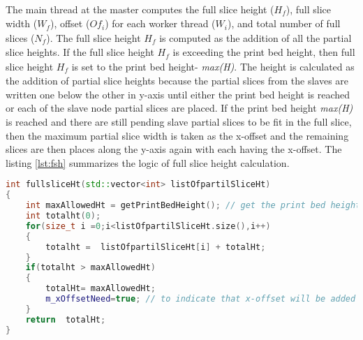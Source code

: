 The main thread at the master computes the full slice height (\begin{math}H_{\textit{f}}\end{math}), full slice width (\begin{math}W_{\textit{f}}\end{math}), offset (\begin{math}Of_{\textit{i}}\end{math}) for each worker thread (\begin{math}W_{\textit{i}}\end{math}), and total number of full slices (\begin{math}N_{\textit{f}}\end{math}). The full slice height \begin{math}H_{\textit{f}}\end{math} is computed as the addition of all the partial slice heights. If the full slice height \begin{math}H_{\textit{f}}\end{math} is exceeding the print bed height, then full slice height \begin{math}H_{\textit{f}}\end{math} is set to the print bed height- \textit{max(H)}. The height is calculated as the addition of partial slice heights because the partial slices from the slaves are written one below the other in y-axis until either the print bed height is reached or each of the slave node partial slices are placed. If the print bed height \textit{max(H)} is reached and there are still pending slave partial slices to be fit in the full slice, then the maximum partial slice width is taken as the x-offset and the remaining slices are then places along the y-axis again with each having the x-offset. The listing \ref{lst:fsh} summarizes the logic of full slice height calculation. \newline

\begin{lstlisting}[language=C++,label={lst:fsh},caption={Calculate full slice height}]
int fullsliceHt(std::vector<int> listOfpartilSliceHt)
{
	int maxAllowedHt = getPrintBedHeight(); // get the print bed height
	int totalht(0);
	for(size_t i =0;i<listOfpartilSliceHt.size(),i++)
	{
		totalht =  listOfpartilSliceHt[i] + totalHt;
	}
	if(totalht > maxAllowedHt)
	{
		totalHt= maxAllowedHt; 
		m_xOffsetNeed=true; // to indicate that x-offset will be added to some slaves
	}
	return 	totalHt;
}

\end{lstlisting}

